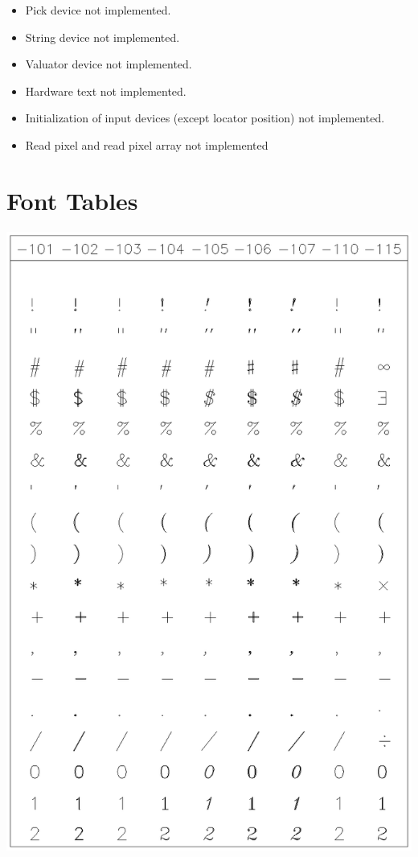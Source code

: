 \documentclass[11pt]{article}
\begin{document}

\begin{itemize}
\item Pick device not implemented.
\item String device not implemented.
\item Valuator device not implemented.
\item Hardware text not implemented.
\item Initialization of input devices (except locator position) not implemented.
\item Read pixel and read pixel array not implemented
\end{itemize}

\newpage\section{Font Tables}\label{fonts}

\includegraphics[height=0.95\textheight]{sun83-c1.eps}
\end{document}
